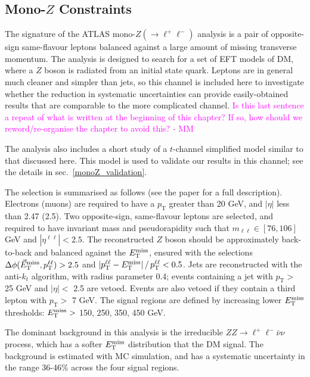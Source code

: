 \subsection{Mono-$Z$ Constraints}
\label{monoZ_constraints}
The signature of the ATLAS mono-$Z(\rightarrow \ell^+ \ell^-)$ analysis \cite{Aad:2014monoZlep} is a pair of opposite-sign same-flavour leptons balanced against a large amount of missing transverse momentum. The analysis is designed to search for a set of EFT models of DM, where a $Z$ boson is radiated from an initial state quark. Leptons are in general much cleaner and simpler than jets, so this channel is included here to investigate whether the reduction in systematic uncertainties can provide easily-obtained results that are comparable to the more complicated \monojet channel. \textcolor{magenta}{Is this last sentence a repeat of what is written at the beginning of this chapter? If so, how should we reword/re-organise the chapter to avoid this? - MM}

The analysis also includes a short study of a $t$-channel simplified model similar to that discussed here. This model is used to validate our results in this channel; see the details in sec.~\ref{monoZ_validation}.

The selection is summarised as follows (see the paper for a full description). Electrons (muons) are required to have a $p_{\mathrm{T}}$ greater than 20 GeV, and $|\eta|$ less than 2.47 (2.5). Two opposite-sign, same-flavour leptons are selected, and required to have invariant mass and pseudorapidity such that $m_{\ell \ell} \in [76, 106]$ GeV and $|\eta^{\ell \ell}| < 2.5$. The reconstructed $Z$ boson should be approximately back-to-back and balanced against the $E_{\mathrm{T}}^{\mathrm{miss}}$, ensured with the selections $\Delta \phi (\vec{E}_{\mathrm{T}}^{\mathrm{miss}}, p_{\mathrm{T}}^{\ell \ell}) > 2.5$ and $| p_{\mathrm{T}}^{\ell \ell} - E_{\mathrm{T}}^{\mathrm{miss}} | \, /  \, p_{\mathrm{T}}^{\ell \ell} < 0.5$. Jets are reconstructed with the anti-$k_t$ algorithm, with radius parameter 0.4; events containing a jet with $p_{\mathrm{T}}>$ 25 GeV and $|\eta|< $ 2.5 are vetoed. Events are also vetoed if they contain a third lepton with $p_{\mathrm{T}}>$ 7 GeV. The signal regions are defined by increasing lower $E_{\mathrm{T}}^{\mathrm{miss}}$ thresholds: $E_{\mathrm{T}}^{\mathrm{miss}} >$ 150, 250, 350, 450 GeV.


The dominant background in this analysis is the irreducible $ZZ \rightarrow \ell^+ \ell^- \bar{\nu} \nu$ process, which has a softer $E_{\mathrm{T}}^{\mathrm{miss}}$ distribution that the DM signal. The background is estimated with MC simulation, and has a systematic uncertainty in the range 36-46$\%$ across the four signal regions.

